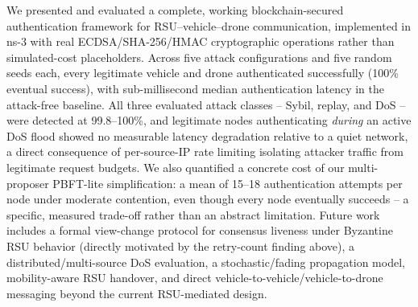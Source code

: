 \documentclass[conference]{IEEEtran}
\begin{document}
We presented and evaluated a complete, working blockchain-secured
authentication framework for RSU--vehicle--drone communication,
implemented in ns-3 with real ECDSA/SHA-256/HMAC cryptographic
operations rather than simulated-cost placeholders. Across five attack
configurations and five random seeds each, every legitimate vehicle
and drone authenticated successfully (100\% eventual success), with
sub-millisecond median authentication latency in the attack-free
baseline. All three evaluated attack classes -- Sybil, replay, and
DoS -- were detected at 99.8--100\%, and legitimate nodes
authenticating \emph{during} an active DoS flood showed no measurable
latency degradation relative to a quiet network, a direct consequence
of per-source-IP rate limiting isolating attacker traffic from
legitimate request budgets. We also quantified a concrete cost of our
multi-proposer PBFT-lite simplification: a mean of 15--18
authentication attempts per node under moderate contention, even
though every node eventually succeeds -- a specific, measured
trade-off rather than an abstract limitation. Future work includes a
formal view-change protocol for consensus liveness under Byzantine RSU
behavior (directly motivated by the retry-count finding above), a
distributed/multi-source DoS evaluation, a stochastic/fading
propagation model, mobility-aware RSU handover, and direct
vehicle-to-vehicle/vehicle-to-drone messaging beyond the current
RSU-mediated design.



\end{document}

